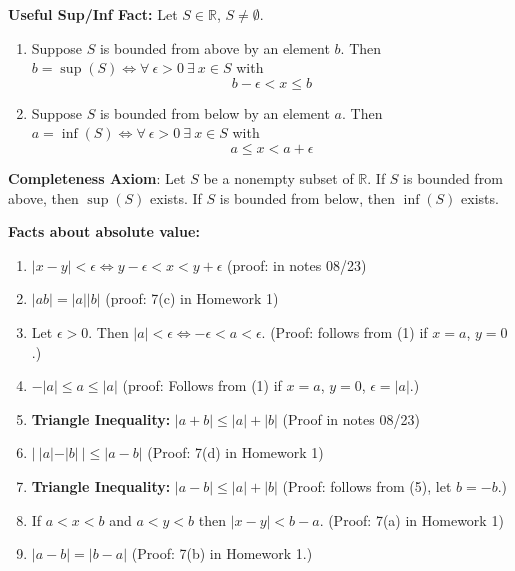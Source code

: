\textbf{Useful Sup/Inf Fact:} Let \(S \in \mathbb{R}\), \(S \neq \emptyset\). 

\begin{enumerate}[(1)]

\item Suppose \(S\) is bounded from above by an element \(b\). Then \(b = \sup(S) \iff \forall \ \epsilon >0 \ \exists \ x \in S\) with \[b - \epsilon < x \leq b\]

\item Suppose \(S\) is bounded from below by an element \(a\). Then \(a = \inf(S) \iff \forall \ \epsilon >0 \ \exists \ x \in S\) with \[a \leq x < a + \epsilon\]

\end{enumerate}

\textbf{Completeness Axiom}: Let \(S\) be a nonempty subset of \(\mathbb{R}\). If \(S\) is bounded from above, then \(\sup(S)\) exists. If \(S\) is bounded from below, then \(\inf(S)\) exists.


\textbf{Facts about absolute value:}

\begin{enumerate}[(1)]

\item \(|x-y| < \epsilon \iff y - \epsilon < x < y + \epsilon\) (proof: in notes 08/23)

\item \(|ab| = |a||b|\) (proof: 7(c) in Homework 1)

\item Let \(\epsilon >0\). Then \(|a| < \epsilon \iff -\epsilon < a < \epsilon\). (Proof: follows from (1) if \(x = a\), \(y = 0\).)

\item \(-|a| \leq a \leq |a|\) (proof: Follows from (1) if \(x = a\), \(y = 0\), \(\epsilon = |a|\).)

\item \textbf{Triangle Inequality:} \(|a + b| \leq |a| + |b|\) (Proof in notes 08/23)

\item \(|\ |a| - |b| \ | \leq |a - b|\) (Proof: 7(d) in Homework 1)

\item \textbf{Triangle Inequality:} \(|a - b| \leq |a| + |b|\) (Proof: follows from (5), let \(b = -b\).)

\item If \(a < x < b\) and \(a < y < b\) then \(|x - y| < b - a\). (Proof: 7(a) in Homework 1)

\item \(|a - b| = |b - a|\) (Proof: 7(b) in Homework 1.)

\end{enumerate}

